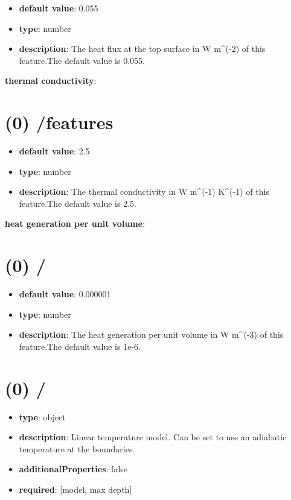 \begin{itemize}[leftmargin=0em]\item {\bf default value}: 0.055
\item {\bf type}: number
\item {\bf description}: The heat flux at the top surface in W m^(-2) of this feature.The default value is 0.055.
\end{itemize}\item {\bf thermal conductivity}: \section{(0) /features}
\begin{itemize}[leftmargin=0em]\item {\bf default value}: 2.5
\item {\bf type}: number
\item {\bf description}: The thermal conductivity in W m^(-1) K^(-1) of this feature.The default value is 2.5.
\end{itemize}\item {\bf heat generation per unit volume}: \section{(0) /}
\begin{itemize}[leftmargin=0em]\item {\bf default value}: 0.000001
\item {\bf type}: number
\item {\bf description}: The heat generation per unit volume in W m^(-3) of this feature.The default value is 1e-6.
\end{itemize}\section{(0) /}
\begin{itemize}[leftmargin=0em]\item {\bf type}: object
\item {\bf description}: Linear temperature model. Can be set to use an adiabatic temperature at the boundaries.
\item {\bf additionalProperties}: false
\item {\bf required}: [model, max depth]\end{itemize}
